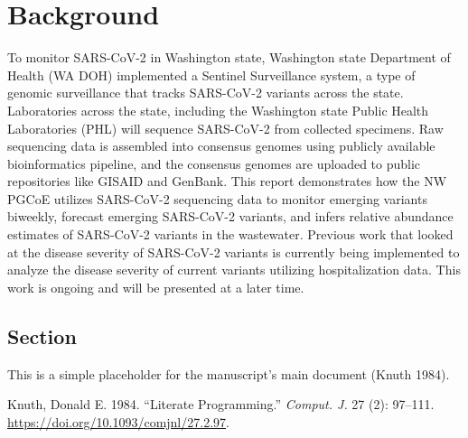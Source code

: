 \documentclass[
  twocolumn]{article}
\newlength{\cslhangindent}
\newenvironment{CSLReferences}[2] %
 {\begin{list}{}{%
  \setlength{\itemindent}{0pt}
  \setlength{\leftmargin}{0pt}
  \setlength{\parsep}{0pt}
  \ifodd #1
   \setlength{\leftmargin}{\cslhangindent}
   \setlength{\itemindent}{-1\cslhangindent}
  \fi
  \setlength{\itemsep}{#2\baselineskip}}}
 {\end{list}}
\begin{document}
\section{Background}\label{background}

To monitor SARS-CoV-2 in Washington state, Washington state Department
of Health (WA DOH) implemented a Sentinel Surveillance system, a type of
genomic surveillance that tracks SARS-CoV-2 variants across the state.
Laboratories across the state, including the Washington state Public
Health Laboratories (PHL) will sequence SARS-CoV-2 from collected
specimens. Raw sequencing data is assembled into consensus genomes using
publicly available bioinformatics pipeline, and the consensus genomes
are uploaded to public repositories like GISAID and GenBank. This report
demonstrates how the NW PGCoE utilizes SARS-CoV-2 sequencing data to
monitor emerging variants biweekly, forecast emerging SARS-CoV-2
variants, and infers relative abundance estimates of SARS-CoV-2 variants
in the wastewater. Previous work that looked at the disease severity of
SARS-CoV-2 variants is currently being implemented to analyze the
disease severity of current variants utilizing hospitalization data.
This work is ongoing and will be presented at a later time.

\subsection{Section}\label{section}

This is a simple placeholder for the manuscript's main document (Knuth
1984).

\label{refs}
\begin{CSLReferences}{1}{0}
Knuth, Donald E. 1984. {``Literate Programming.''} \emph{Comput. J.} 27
(2): 97--111. \url{https://doi.org/10.1093/comjnl/27.2.97}.

\end{CSLReferences}
\end{document}
